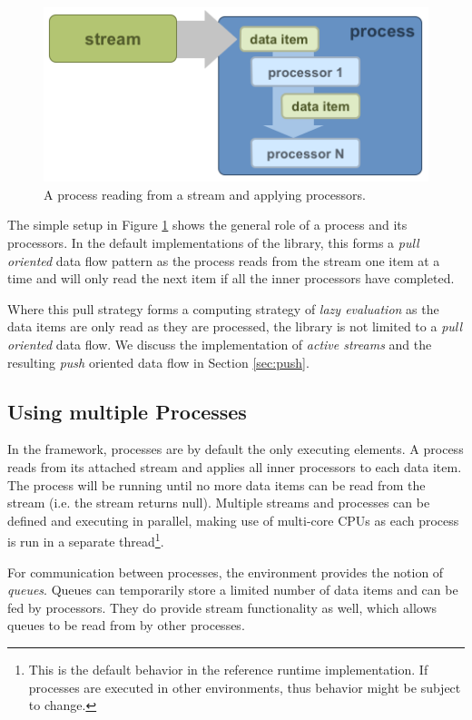 \begin{figure}[h!]
\centering
\includegraphics[scale=0.5]{graphics/inside-process.png}
\caption{\label{fig:process}A process reading from a stream and applying processors.}
\end{figure}

The simple setup in Figure \ref{fig:process} shows the general role of
a process and its processors. In the default implementations of the
\streams library, this forms a {\em pull oriented} data flow pattern
as the process reads from the stream one item at a time and will only
read the next item if all the inner processors have completed. 

Where this pull strategy forms a computing strategy of {\em lazy
  evaluation} as the data items are only read as they are processed,
the \streams library is not limited to a {\em pull oriented} data
flow. We discuss the implementation of {\em active streams} and the
resulting {\em push} oriented data flow in Section \ref{sec:push}.


\subsection*{Using multiple Processes}
In the \streams framework, processes are by default the only executing
elements. A process reads from its attached stream and applies all
inner processors to each data item. The process will be running until
no more data items can be read from the stream (i.e. the stream
returns {\ttfamily null}). Multiple streams and processes can be
defined and executing in parallel, making use of multi-core CPUs as
each process is run in a separate thread\footnote{This is the default
  behavior in the reference \streams runtime implementation. If
  \streams processes are executed in other environments, thus behavior
  might be subject to change.}.

For communication between processes, the \streams environment provides
the notion of {\em queues}. Queues can temporarily store a limited
number of data items and can be fed by processors. They do provide
stream functionality as well, which allows queues to be read from by
other processes.

